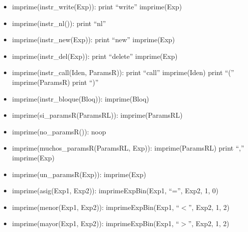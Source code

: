 \documentclass[11pt]{article}
\begin{document}
\begin{itemize}
            \item imprime(instr\_write(Exp)):
                \subitem print “write”
                \subitem imprime(Exp)
            
            \item imprime(instr\_nl()):
                \subitem print “nl”
            
            \item imprime(instr\_new(Exp)):
                \subitem print “new”
                \subitem imprime(Exp)
            
            \item imprime(instr\_del(Exp)):
                \subitem print “delete”
                \subitem imprime(Exp)
            
            \item imprime(instr\_call(Iden, ParamsR)):
                \subitem print “call”
                \subitem imprime(Iden)
                \subitem print “(”
                \subitem imprime(ParamsR)
                \subitem print “)”
            
            \item imprime(instr\_bloque(Bloq)):
                \subitem imprime(Bloq)
            
            \item imprime(si\_paramsR(ParamsRL)):
                \subitem imprime(ParamsRL)
            
            \item imprime(no\_paramsR()): noop
            
            \item imprime(muchos\_paramsR(ParamsRL, Exp)):
                \subitem imprime(ParamsRL)
                \subitem print “,”
                \subitem imprime(Exp)
            
            \item imprime(un\_paramsR(Exp)):
                \subitem imprime(Exp)
            
            \item imprime(asig(Exp1, Exp2)):
                \subitem imprimeExpBin(Exp1, “=”, Exp2, 1, 0)
            
            \item imprime(menor(Exp1, Exp2)):
                \subitem imprimeExpBin(Exp1, “$<$”, Exp2, 1, 2)
            
            \item imprime(mayor(Exp1, Exp2)):
                \subitem imprimeExpBin(Exp1, “$>$”, Exp2, 1, 2)
            

\end{itemize}
\end{document}
